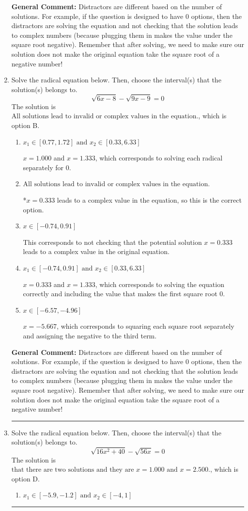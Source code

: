 \documentclass{extbook}[14pt]
\newcommand{\litem}[1]{\item #1

\rule{\textwidth}{0.4pt}}
\begin{document}
\begin{enumerate}
{\textbf{General Comment:} Distractors are different based on the number of solutions. For example, if the question is designed to have 0 options, then the distractors are solving the equation and not checking that the solution leads to complex numbers (because plugging them in makes the value under the square root negative). Remember that after solving, we need to make sure our solution does not make the original equation take the square root of a negative number!
}
\litem{
Solve the radical equation below. Then, choose the interval(s) that the solution(s) belongs to.
\[ \sqrt{6 x - 8} - \sqrt{9 x - 9} = 0 \]The solution is \( \text{All solutions lead to invalid or complex values in the equation.} \), which is option B.\begin{enumerate}[label=\Alph*.]
\item \( x_1 \in [0.77, 1.72] \text{ and } x_2 \in [0.33,6.33] \)

$x = 1.000$ and $x = 1.333$, which corresponds to solving each radical separately for 0.
\item \( \text{All solutions lead to invalid or complex values in the equation.} \)

*$x = 0.333$ leads to a complex value in the equation, so this is the correct option.
\item \( x \in [-0.74,0.91] \)

This corresponds to not checking that the potential solution $x = 0.333$ leads to a complex value in the original equation.
\item \( x_1 \in [-0.74, 0.91] \text{ and } x_2 \in [0.33,6.33] \)

$x = 0.333$ and $x = 1.333$, which corresponds to solving the equation correctly and including the value that makes the first square root 0.
\item \( x \in [-6.57,-4.96] \)

$x = -5.667$, which corresponds to squaring each square root separately and assigning the negative to the third term.
\end{enumerate}

\textbf{General Comment:} Distractors are different based on the number of solutions. For example, if the question is designed to have 0 options, then the distractors are solving the equation and not checking that the solution leads to complex numbers (because plugging them in makes the value under the square root negative). Remember that after solving, we need to make sure our solution does not make the original equation take the square root of a negative number!
}
\litem{
Solve the radical equation below. Then, choose the interval(s) that the solution(s) belongs to.
\[ \sqrt{16 x^2 + 40} - \sqrt{56 x} = 0 \]The solution is \( \text{that there are two solutions and they are } x = 1.000 \text{ and } x = 2.500. \), which is option D.\begin{enumerate}[label=\Alph*.]
\item \( x_1 \in [-5.9, -1.2] \text{ and } x_2 \in [-4,1] \)


\end{enumerate}}
\end{enumerate}
\end{document}
